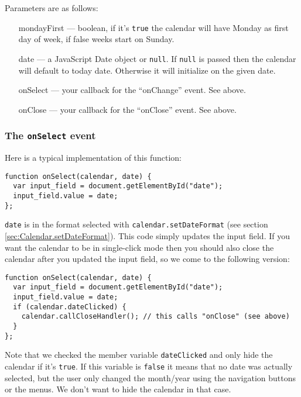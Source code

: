 \documentclass[a4paper,10pt]{article}
\begin{document}
Parameters are as follows:

\begin{itemize}

\item [mondayFirst] --- boolean, if it's \texttt{true} the calendar will have
Monday as first day of week, if false weeks start on Sunday.

\item [date] --- a JavaScript Date object or \texttt{null}.  If \texttt{null}
is passed then the calendar will default to today date.  Otherwise it will
initialize on the given date.

\item [onSelect] --- your callback for the ``onChange'' event.  See above.

\item [onClose] --- your callback for the ``onClose'' event.  See above.

\end{itemize}

\subsubsection*{The \texttt{onSelect} event}\label{sec:Calendar.onSelect}

Here is a typical implementation of this function:

\begin{verbatim}
function onSelect(calendar, date) {
  var input_field = document.getElementById("date");
  input_field.value = date;
};
\end{verbatim}

\noindent \texttt{date} is in the format selected with \texttt{calendar.setDateFormat}
(see section \ref{sec:Calendar.setDateFormat}).  This code simply updates the
input field.  If you want the calendar to be in single-click mode then you
should also close the calendar after you updated the input field, so we come to
the following version:

\begin{verbatim}
function onSelect(calendar, date) {
  var input_field = document.getElementById("date");
  input_field.value = date;
  if (calendar.dateClicked) {
    calendar.callCloseHandler(); // this calls "onClose" (see above)
  }
};
\end{verbatim}

\noindent Note that we checked the member variable \texttt{dateClicked} and
only hide the calendar if it's \texttt{true}.  If this variable is \texttt{false} it
means that no date was actually selected, but the user only changed the
month/year using the navigation buttons or the menus.  We don't want to hide
the calendar in that case.
\end{document}
